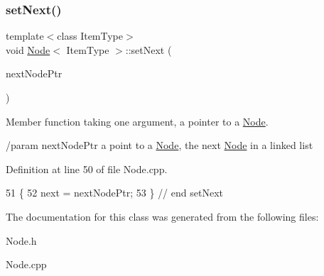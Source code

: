 \subsubsection{\texorpdfstring{set\+Next()}{setNext()}}
{\footnotesize\ttfamily template$<$class Item\+Type$>$ \\
void \hyperlink{classNode}{Node}$<$ Item\+Type $>$\+::set\+Next (\begin{DoxyParamCaption}\item[{\hyperlink{classNode}{Node}$<$ Item\+Type $>$ $\ast$}]{next\+Node\+Ptr }\end{DoxyParamCaption})}



Member function taking one argument, a pointer to a \hyperlink{classNode}{Node}. 

/param next\+Node\+Ptr a point to a \hyperlink{classNode}{Node}, the next \hyperlink{classNode}{Node} in a linked list 

Definition at line 50 of file Node.\+cpp.


\begin{DoxyCode}
51 \{
52     next = nextNodePtr;
53 \} \textcolor{comment}{// end setNext}
\end{DoxyCode}


The documentation for this class was generated from the following files\+:\begin{DoxyCompactItemize}
\item 
Node.\+h\item 
Node.\+cpp\end{DoxyCompactItemize}
